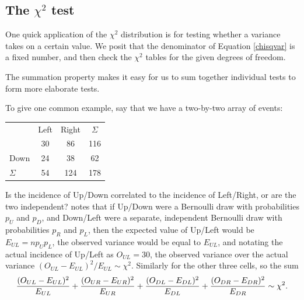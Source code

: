 


\subsection{The $\chi^2$ test}
One quick application of the $\chi^2$ distribution is for testing
whether a variance takes on a certain value. We posit that the
denominator of Equation \ref{chisqvar} is a fixed number, and then check
the $\chi^2$ tables for the given degrees of freedom.

The summation property makes it easy for us to sum together individual
tests to form more elaborate tests. 

To give one common example, say that we have a two-by-two array of
events:

\renewcommand\arraystretch{1.1}
\begin{center}
\begin{tabular}{lccc}
    & Left  & Right & $\Sigma$\\
\hhline{~--~}
\multicolumn{1}{c|}{Up}& 30    & 86    & \multicolumn{1}{|c}{116}     \\
\multicolumn{1}{c|}{Down}& 24    & 38  & \multicolumn{1}{|c}{62}     \\
\hhline{~--~}
$\Sigma$& 54    & 124    & 178
\end{tabular}
\end{center}

Is the incidence of Up/Down correlated to the incidence of Left/Right,
or are the two independent? \citet{pearson:chisq} notes that
if Up/Down were a Bernoulli draw with probabilities $p_U$ and $p_D$, and Down/Left
were a separate, independent Bernoulli draw with probabilities $p_R$ and
$p_L$, then the expected value of 
Up/Left would be $E_{UL}=np_Up_L$, the observed variance
would be equal to $E_{UL}$, and notating the actual incidence of Up/Left
as $O_{UL}=30$, the observed variance over the actual variance 
$(O_{UL} - E_{UL})^2/E_{UL} \sim \chi^2$. Similarly for the other three cells,
so the sum 
\begin{equation}
{(O_{UL} - E_{UL})^2\over E_{UL}} +
{(O_{UR} - E_{UR})^2\over E_{UR}} +
{(O_{DL} - E_{DL})^2\over E_{DL}} +
{(O_{DR} - E_{DR})^2\over E_{DR}} 
\sim \chi^2.\label{chisqeqn}
\end{equation}

